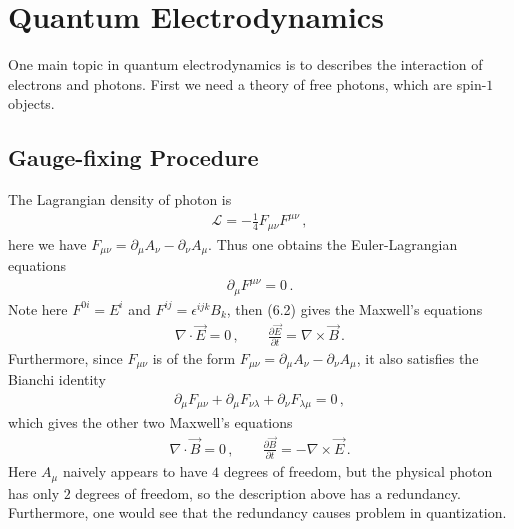 \documentclass[11pt, onesided]{book}
\theoremstyle{break}
\theoremstyle{break}
\newcommand{\pd}{\partial}
\begin{document}
\newpage
\chapter{Quantum Electrodynamics}
One main topic in quantum electrodynamics is to describes the interaction of electrons and photons. First we need a theory of free photons, which are spin-$1$ objects. 

\section[Gauge-fixing Procedure]{\color{red} Gauge-fixing Procedure\color{black}}
The Lagrangian density of photon is
\begin{align}
\mathcal{L} = -\frac{1}{4}F_{\mu\nu}F^{\mu\nu}\,,
\end{align}
here we have $F_{\mu\nu} = \pd_\mu A_\nu - \pd_\nu A_\mu$. Thus one obtains the Euler-Lagrangian equations
\begin{align}
\pd_\mu F^{\mu\nu} = 0\,.
\end{align}
Note here $F^{0i} = E^i$ and $F^{ij} = \epsilon^{ijk}B_k$, then (6.2) gives the Maxwell's equations
\begin{align*}
\nabla \cdot \vec{E} = 0\,,\qquad
\frac{\pd \vec{E}}{\pd t} = \nabla \times \vec{B}\,.
\end{align*}
Furthermore, since $F_{\mu\nu}$ is of the form $F_{\mu\nu} = \pd_\mu A_\nu - \pd_\nu A_\mu$, it also satisfies the Bianchi identity
\begin{align*}
\pd_\mu F_{\mu\nu} + \pd_\mu F_{\nu\lambda} + \pd_\nu F_{\lambda \mu} = 0\,,
\end{align*}
which gives the other two Maxwell's equations
\begin{align*}
\nabla \cdot \vec{B} = 0\,,\qquad
\frac{\pd \vec{B}}{\pd t} = -\nabla \times \vec{E}\,.
\end{align*}
Here $A_\mu$ naively appears to have $4$ degrees of freedom, but the physical photon has only $2$ degrees of freedom, so the description above has a redundancy. Furthermore, one would see that the redundancy causes problem in quantization. \\
\end{document}
